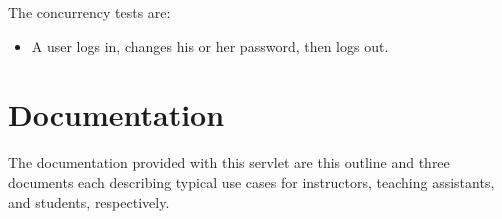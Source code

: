 \documentclass[a4paper]{article}
\begin{document}
The concurrency tests are:

\begin{itemize}
\item{A user logs in, changes his or her password, then logs out.}
\end{itemize}


\section{Documentation}\label{sec:docs}

The documentation provided with this servlet are this outline and three
documents each describing typical use cases for instructors, teaching
assistants, and students, respectively.
\end{document}
